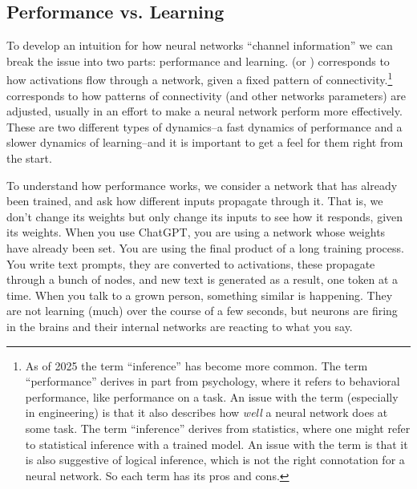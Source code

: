 \subsection{Performance vs. Learning}\label{performanceLearning}


To develop an intuition for how neural networks ``channel information'' we can break the issue into two parts: performance and learning.  (or ) corresponds to how activations flow through a network, given a fixed pattern of connectivity.\footnote{As of 2025 the term ``inference'' has become more common. The term ``performance'' derives in part from psychology, where it refers to behavioral performance, like performance on a task.  An issue with the term (especially in engineering) is that it also describes how \emph{well} a neural network does at some task. The term ``inference'' derives from statistics, where one might refer to statistical inference with a trained model. An issue with the term is that it is also suggestive of logical inference, which is not the right connotation for a neural network. So each term has its pros and cons.}   corresponds to how patterns of connectivity (and other networks parameters) are adjusted, usually in an effort to make a neural network perform more effectively. These are two different types of dynamics--a fast dynamics of performance and a slower dynamics of learning--and it is important to get a feel for them right from the start.
 
To understand how performance works, we consider a network that has already been trained, and ask how different inputs propagate through it. That is, we don't change its weights but only change its inputs to see how it responds, given its weights. When you use ChatGPT, you are using a network whose weights have already been set. You are using the final product of a long training process. You write text prompts, they are converted to activations, these propagate through a bunch of nodes, and new text is generated as a result, one token at a time.  When you talk to a grown person, something similar is happening. They are not learning (much) over the course of a few seconds, but neurons are firing in the brains and their internal networks are reacting to what you say.  

